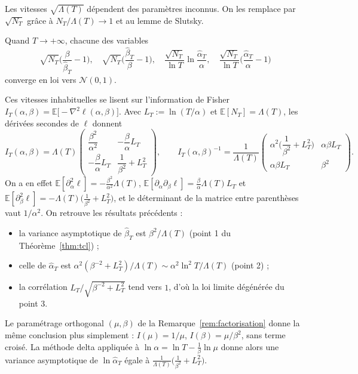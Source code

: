 Les vitesses $\sqrt{\Lambda(T)}$ dépendent des paramètres inconnus. On les remplace par $\sqrt{N_T}$ grâce à $N_T/\Lambda(T)\to1$ et au lemme de Slutsky.

\begin{corollaire}\label{cor:autonorm}
Quand $T\to+\infty$, chacune des variables
\[
\sqrt{N_T}\Big(\frac{\beta}{\hat\beta_T}-1\Big),\quad
\sqrt{N_T}\Big(\frac{\hat\beta_T}{\beta}-1\Big),\quad
\frac{\sqrt{N_T}}{\ln T}\ln\frac{\hat\alpha_T}{\alpha},\quad
\frac{\sqrt{N_T}}{\ln T}\Big(\frac{\hat\alpha_T}{\alpha}-1\Big)
\]
converge en loi vers $\mathcal{N}(0,1)$.
\end{corollaire}

\begin{remarque}\label{rem:fisher}
Ces vitesses inhabituelles se lisent sur l'information de Fisher $I_T(\alpha,\beta)=\mathbb{E}\big[-\nabla^2\ell(\alpha,\beta)\big]$. Avec $L_T:=\ln(T/\alpha)$ et $\mathbb{E}[N_T]=\Lambda(T)$, les dérivées secondes de $\ell$ donnent
\[
I_T(\alpha,\beta)=\Lambda(T)\begin{pmatrix}\dfrac{\beta^2}{\alpha^2}&-\dfrac{\beta}{\alpha}L_T\\[2mm]-\dfrac{\beta}{\alpha}L_T&\dfrac{1}{\beta^2}+L_T^2\end{pmatrix},
\qquad
I_T(\alpha,\beta)^{-1}=\frac{1}{\Lambda(T)}\begin{pmatrix}\alpha^2\Big(\dfrac{1}{\beta^2}+L_T^2\Big)&\alpha\beta L_T\\[2mm]\alpha\beta L_T&\beta^2\end{pmatrix}.
\]
On a en effet $\mathbb{E}[\partial^2_\alpha\ell]=-\frac{\beta^2}{\alpha^2}\Lambda(T)$, $\mathbb{E}[\partial_\alpha\partial_\beta\ell]=\frac{\beta}{\alpha}\Lambda(T)L_T$ et $\mathbb{E}[\partial^2_\beta\ell]=-\Lambda(T)\big(\frac{1}{\beta^2}+L_T^2\big)$, et le déterminant de la matrice entre parenthèses vaut $1/\alpha^2$. On retrouve les résultats précédents :
\begin{itemize}
\item la variance asymptotique de $\hat\beta_T$ est $\beta^2/\Lambda(T)$ (point 1 du Théorème~\ref{thm:tcl}) ;
\item celle de $\hat\alpha_T$ est $\alpha^2(\beta^{-2}+L_T^2)/\Lambda(T)\sim\alpha^2\ln^2T/\Lambda(T)$ (point 2) ;
\item la corrélation $L_T/\sqrt{\beta^{-2}+L_T^2}$ tend vers $1$, d'où la loi limite dégénérée du point 3.
\end{itemize}
Le paramétrage orthogonal $(\mu,\beta)$ de la Remarque~\ref{rem:factorisation} donne la même conclusion plus simplement : $I(\mu)=1/\mu$, $I(\beta)=\mu/\beta^2$, sans terme croisé. La méthode delta appliquée à $\ln\alpha=\ln T-\frac1\beta\ln\mu$ donne alors une variance asymptotique de $\ln\hat\alpha_T$ égale à $\frac{1}{\Lambda(T)}\big(\frac{1}{\beta^2}+L_T^2\big)$.
\end{remarque}

